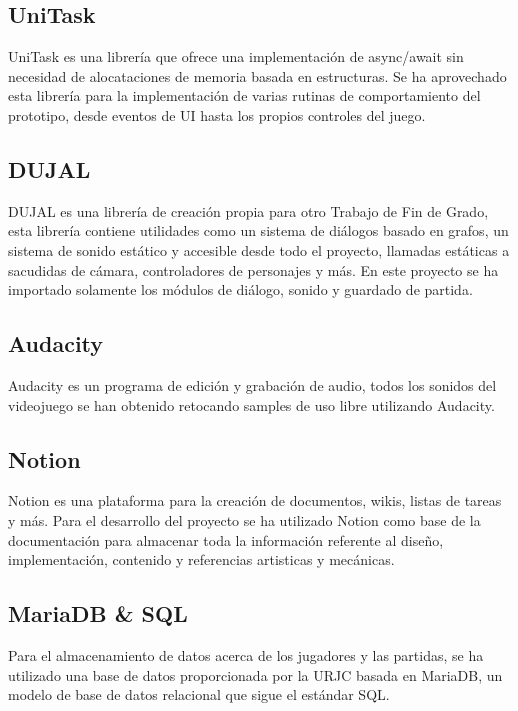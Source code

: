 \subsection{UniTask}

UniTask\cite{UniTask} es una librería que ofrece una implementación de async/await sin necesidad de alocataciones de memoria basada en estructuras. Se ha aprovechado esta librería para la implementación de varias rutinas de comportamiento del prototipo, desde eventos de UI hasta los propios controles del juego.

\subsection{DUJAL}

DUJAL\cite{DUJAL} es una librería de creación propia para otro Trabajo de Fin de Grado, esta librería contiene utilidades como un sistema de diálogos basado en grafos, un sistema de sonido estático y accesible desde todo el proyecto, llamadas estáticas a sacudidas de cámara, controladores de personajes y más. En este proyecto se ha importado solamente los módulos de diálogo, sonido y guardado de partida.

\subsection{Audacity}

Audacity\cite{Audacity} es un programa de edición y grabación de audio, todos los sonidos del videojuego se han obtenido retocando samples de uso libre utilizando Audacity.  

\subsection{Notion}

Notion\cite{notion} es una plataforma para la creación de documentos, wikis, listas de tareas y más. Para el desarrollo del proyecto se ha utilizado Notion como base de la documentación para almacenar toda la información referente al diseño, implementación, contenido y referencias artisticas y mecánicas.

\subsection{MariaDB \& SQL}

Para el almacenamiento de datos acerca de los jugadores y las partidas, se ha utilizado una base de datos proporcionada por la URJC basada en MariaDB\cite{mariadb}, un modelo de base de datos relacional que sigue el estándar SQL.


